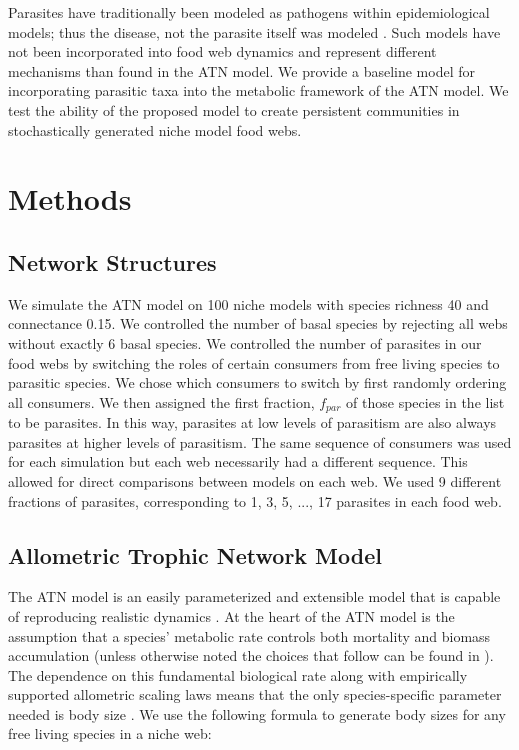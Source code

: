 \documentclass[/home/nkappler/Research/Dissertation/dissertation.tex]{subfiles}
\begin{document}
\begin{bibunit}
Parasites have traditionally been modeled as pathogens within epidemiological
models; thus the disease, not the parasite itself was modeled \cite{May1991}.
Such models have not been incorporated into food web dynamics and represent
different mechanisms than found in the ATN model. We provide a baseline model
for incorporating parasitic taxa into the metabolic framework of the ATN model.
We test the ability of the proposed model to create persistent communities in
stochastically generated niche model food webs.

\section{Methods}

\subsection{Network Structures}

We simulate the ATN model on 100 niche models with species richness 40 and
connectance 0.15. We controlled the number of basal species by rejecting all
webs without exactly 6 basal species.  We controlled the number of parasites in
our food webs by switching the roles of certain consumers from free living
species to parasitic species. We chose which consumers to switch by first
randomly ordering all consumers. We then assigned the first fraction, $f_{par}$
of those species in the list to be parasites. In this way, parasites at low
levels of parasitism are also always parasites at higher levels of parasitism.
The same sequence of consumers was used for each simulation but each web
necessarily had a different sequence.  This allowed for direct comparisons
between models on each web. We used 9 different fractions of parasites,
corresponding to 1, 3, 5, ..., 17 parasites in each food web.

\subsection{Allometric Trophic Network Model}

The ATN model is an easily parameterized and extensible model that is capable
of reproducing realistic dynamics \cite{Boit2012}. At the heart of the ATN
model is the assumption that a species' metabolic rate controls both mortality
and biomass accumulation (unless otherwise noted the choices that follow can be
found in \cite{Brose2006b}). The dependence on this fundamental biological rate
along with empirically supported allometric scaling laws means that the only
species-specific parameter needed is body size \cite{Brown2004}. We use the
following formula to generate body sizes for any free living species in a niche
web:


\end{bibunit}
\end{document}
